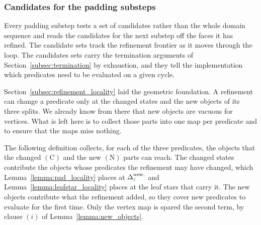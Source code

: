 \documentclass[a4paper, 12pt]{article}
\makeatletter
\newcommand{\green}{\color{ForestGreen}}
\DeclareRobustCommand{\simplexsubsetNew}[2][]{\Delta^{\mathrm{new}\ifx\@empty#1\@empty\else,#1\fi}_{#2}}
\renewcommand{\l}{{\green\ell}}
\theoremstyle{definition}
\theoremstyle{plain}
\numberwithin{equation}{section}
\makeatother
\begin{document}
\smallskip

\subsubsection{Candidates for the padding substeps}
\label{subsubsec:locality_candidates}

Every padding substep tests a set of candidates rather than the whole domain sequence and reads the candidates for the next substep off the faces it has refined. The candidate sets track the refinement frontier as it moves through the loop. The candidates sets carry the termination arguments of Section~\ref{subsec:termination} by exhaustion, and they tell the implementation which predicates need to be evaluated on a given cycle.

Section~\ref{subsec:refinement_locality} laid the geometric foundation. A refinement can change a predicate only at the changed states and the new objects of its three splits. We already know from there that new objects are vacuous for vertices. What is left here is to collect those parts into one map per predicate and to ensure that the maps miss nothing.

The following definition collects, for each of the three predicates, the objects that the changed $(\mathrm{C})$ and the new $(\mathrm{N})$ parts can reach. The changed states contribute the objects whose predicates the refinement may have changed, which Lemma~\ref{lemma:pad_locality} places at $\simplexsubsetNew{\l}$ and Lemma~\ref{lemma:leafstar_locality} places at the leaf stars that carry it. The new objects contribute what the refinement added, so they cover new predicates to evaluate for the first time. Only the vertex map is spared the second term, by clause $(i)$ of Lemma~\ref{lemma:new_objects}.
\end{document}
